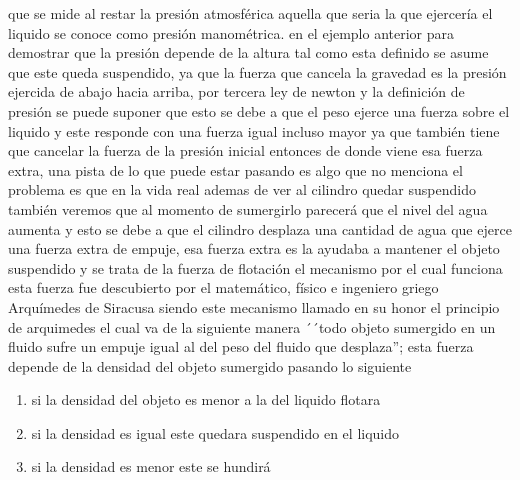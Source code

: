 \documentclass{article}
\begin{document}
que se mide al restar la presión atmosférica aquella que seria la que ejercería el liquido se conoce como presión manométrica.
en el ejemplo anterior para demostrar que la presión depende de la altura tal como esta definido se asume
que este queda suspendido, ya que la fuerza que cancela la gravedad es la presión ejercida de abajo hacia arriba, por tercera ley de newton y la definición de presión
se puede suponer que esto se debe a que el peso ejerce una fuerza sobre el liquido y este responde con una fuerza igual incluso mayor ya que también tiene que cancelar la fuerza de la presión inicial
entonces de donde viene esa fuerza extra,
una pista de lo que puede estar pasando es  algo que no menciona el problema
es que en la vida real ademas de ver al cilindro quedar suspendido también veremos que al momento de sumergirlo parecerá que el nivel del agua aumenta
y esto se debe a que el cilindro desplaza una cantidad de agua que ejerce una fuerza extra de empuje, esa fuerza extra es la ayudaba a mantener el objeto suspendido y se trata de la fuerza de flotación
el mecanismo por el cual funciona esta fuerza fue descubierto por el matemático, físico e ingeniero griego Arquímedes de Siracusa siendo este mecanismo llamado en su honor
el principio de arquimedes el cual va de la siguiente manera ´´todo objeto sumergido en un fluido sufre un empuje igual al del peso del fluido que desplaza'';
esta fuerza depende de la densidad del objeto sumergido pasando lo siguiente\\
\begin{enumerate}
    \item si la densidad del objeto es menor a la del liquido flotara
    \item si la densidad es igual este quedara suspendido en el liquido
    \item si la densidad es menor este se hundirá 
\end{enumerate}
\end{document}
